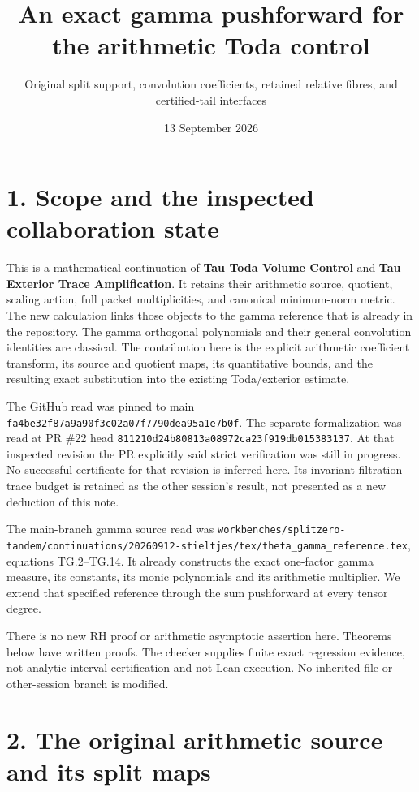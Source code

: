 \documentclass[
  11pt,
]{article}
\title{An exact gamma pushforward for the arithmetic Toda control}
\subtitle{Original split support, convolution coefficients, retained
relative fibres, and certified-tail interfaces}
\author{}
\date{13 September 2026}
\begin{document}
\maketitle

{
\setcounter{tocdepth}{3}
\tableofcontents
}
\section{1. Scope and the inspected collaboration
state}\label{scope-and-the-inspected-collaboration-state}

This is a mathematical continuation of \textbf{Tau Toda Volume Control}
and \textbf{Tau Exterior Trace Amplification}. It retains their
arithmetic source, quotient, scaling action, full packet multiplicities,
and canonical minimum-norm metric. The new calculation links those
objects to the gamma reference that is already in the repository. The
gamma orthogonal polynomials and their general convolution identities
are classical. The contribution here is the explicit arithmetic
coefficient transform, its source and quotient maps, its quantitative
bounds, and the resulting exact substitution into the existing
Toda/exterior estimate.

The GitHub read was pinned to main
\texttt{fa4be32f87a9a90f3c02a07f7790dea95a1e7b0f}. The separate
formalization was read at PR \#22 head
\texttt{811210d24b80813a08972ca23f919db015383137}. At that inspected
revision the PR explicitly said strict verification was still in
progress. No successful certificate for that revision is inferred here.
Its invariant-filtration trace budget is retained as the other session's
result, not presented as a new deduction of this note.

The main-branch gamma source read was
\texttt{workbenches/splitzero-tandem/continuations/20260912-stieltjes/tex/theta\_gamma\_reference.tex},
equations TG.2--TG.14. It already constructs the exact one-factor gamma
measure, its constants, its monic polynomials and its arithmetic
multiplier. We extend that specified reference through the sum
pushforward at every tensor degree.

There is no new RH proof or arithmetic asymptotic assertion here.
Theorems below have written proofs. The checker supplies finite exact
regression evidence, not analytic interval certification and not Lean
execution. No inherited file or other-session branch is modified.

\section{2. The original arithmetic source and its split
maps}\label{the-original-arithmetic-source-and-its-split-maps}
\end{document}
